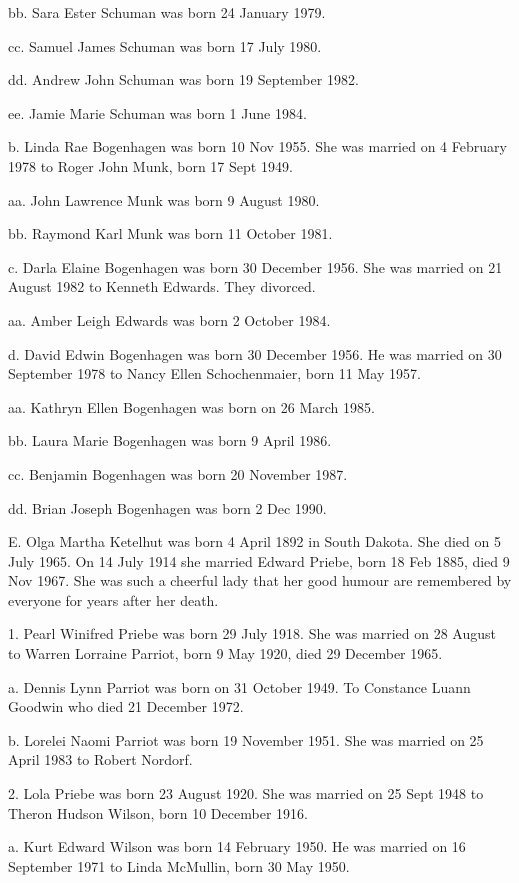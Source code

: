 \documentclass[a4paper]{article}
\begin{document}
bb. Sara Ester Schuman was born 24 January 1979.

cc. Samuel James Schuman was born 17 July 1980.

dd. Andrew John Schuman was born 19 September 1982.

ee. Jamie Marie Schuman was born 1 June 1984. 

b. Linda Rae Bogenhagen was born 10 Nov 1955.  She was married on 4 February 1978 to Roger John Munk, born 17 Sept 1949.

aa. John Lawrence Munk was born 9 August 1980.

bb. Raymond Karl Munk was born 11 October 1981.

c. Darla Elaine Bogenhagen was born 30 December 1956.  She was married on 21 August 1982 to Kenneth Edwards.  They divorced.

aa. Amber Leigh Edwards was born 2 October 1984.

d. David Edwin Bogenhagen was born 30 December 1956.  He was married on 30 September 1978 to Nancy Ellen Schochenmaier, born 11 May 1957.

aa. Kathryn Ellen Bogenhagen was born on 26 March 1985.

bb. Laura Marie Bogenhagen was born 9 April 1986.

cc. Benjamin Bogenhagen was born 20 November 1987.

dd. Brian Joseph Bogenhagen was born 2 Dec 1990.
				
E. Olga Martha Ketelhut was born 4 April 1892 in South Dakota.  She died on 5 July 1965.   On 14 July 1914 she married Edward Priebe, born 18 Feb 1885, died 9 Nov 1967. She was such a cheerful lady that her good humour are remembered by everyone for years after her death.

1. Pearl Winifred Priebe was born 29 July 1918.  She was married on 28 August to Warren Lorraine Parriot, born 9 May 1920, died 29 December 1965.

a. Dennis Lynn Parriot was born on 31 October 1949.   To Constance Luann Goodwin who died 21 December  1972.

b. Lorelei  Naomi Parriot was born 19 November 1951.  She was married on 25 April 1983 to Robert Nordorf.

2. Lola Priebe was born 23 August 1920.  She was married on 25 Sept 1948 to Theron Hudson Wilson, born 10 December 1916.

a. Kurt Edward Wilson was born 14 February 1950.  He was married on 16 September 1971 to Linda McMullin, born 30 May 1950.
\end{document}
